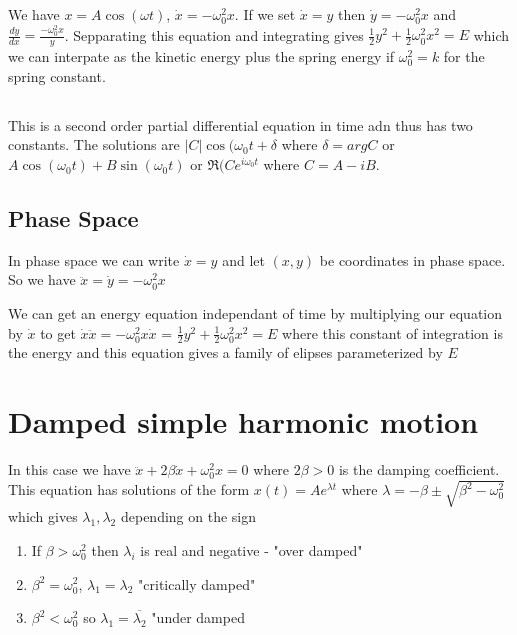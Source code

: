 \documentclass{homework}
\begin{document}
We have $x = A \cos (\omega t)$, $\dot x = -\omega_0^2 x$. If we set $\dot x = y$ then $\dot y = -\omega_0^2 x$ and $\frac{dy}{dx} = \frac{-\omega_0^2 x}{y}$. Sepparating this equation and integrating gives $\frac{1}{2}y^2 + \frac{1}{2}\omega_0^2x^2 = E$ which we can interpate as the kinetic energy plus the spring energy if $\omega_0^2 = k$ for the spring constant. 

\subsection{}
This is a second order partial differential equation in time adn thus has two constants. The solutions are
$|C|\cos(\omega_0 t + \delta$ where $\delta = arg C$ or $A \cos (\omega_0 t) + B \sin (\omega_0 t)$ or $\Re (Ce^{i\omega_0 t}$ where $C = A - iB$.




\subsection{Phase Space}
In phase space we can write $\dot x = y$ and let $(x,y)$ be coordinates in phase space. So we have $\ddot x = \dot y =  -\omega_0^2 x$

We can get an energy equation independant of time by multiplying our equation by $\dot x$ to get $\dot x \ddot x = -\omega_0^2 x \dot x$ = $\frac{1}{2}y^2 + \frac{1}{2}\omega_0^2x^2 = E$ where this constant of integration is the energy and this equation gives a family of elipses parameterized by $E$




\section{Damped simple harmonic motion}
In this case we have $\ddot x + 2\beta \dot x + \omega_0^2 x = 0$ where $2\beta >0$ is the damping coefficient. This equation has solutions of the form $x(t) = Ae^{\lambda t}$ where $\lambda = -\beta \pm \sqrt{\beta^2 - \omega_0^2}$ which gives $\lambda_1, \lambda_2$ depending on the sign

\begin{enumerate}
    \item  If $\beta > \omega_0^2$ then $\lambda_i$ is real and negative - "over damped"
    \item $\beta^2 = \omega_0^2$, $\lambda_1 = \lambda_2$ "critically damped"
    \item $\beta^2 < \omega_0^2$ so $\lambda_1 = \overline{\lambda_2}$ "under damped
\end{enumerate}
\end{document}
